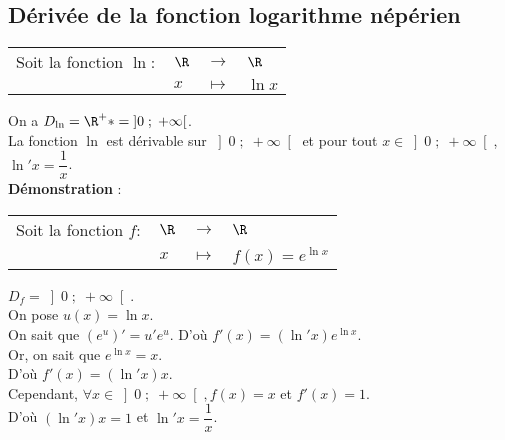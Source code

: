 \vspace*{-5cm}

\newpage

\subsection{Dérivée de la fonction logarithme népérien}

\begin{tabular}{llll}
Soit la fonction  $\ln :$ & $\R$ & $\longrightarrow$ & $\R$ \\
& $x$ & $\longmapsto$ & $\ln x$ \\
\end{tabular}

\vspace*{.3cm}

On a $D_{\ln} = \R^+* = \left] 0 \; ; \; +\infty\right[$. \\

La fonction $\ln$ est dérivable sur $\left] 0 \; ; \; +\infty\right[$ et pour tout $x \in \left] 0 \; ; \; +\infty\right[$, $\ln'x = \dfrac{1}{x}$. \\

\textbf{Démonstration} : \\

\begin{tabular}{llll}
Soit la fonction  $f :$ & $\R$ & $\longrightarrow$ & $\R$ \\
& $x$ & $\longmapsto$ & $f(x) = e^{\ln x}$ \\
\end{tabular}

\vspace*{.3cm}

$D_f = \left] 0 \; ; \; +\infty\right[$. \\

On pose $u(x) = \ln x$. \\

On sait que $\left(e^u\right)' = u'e^u$. D'où $f'(x) = \left(\ln'x\right)e^{\ln x}$. \\

Or, on sait que $e^{\ln x} = x$. \\

D'où $f'(x) = \left(\ln'x\right)x$. \\

Cependant, $\forall x \in \left] 0 \; ; \; +\infty\right[, f(x) = x$ et $f'(x) = 1$. \\

D'où $\left(\ln'x\right)x = 1$ et $\ln'x = \dfrac{1}{x}$. 

